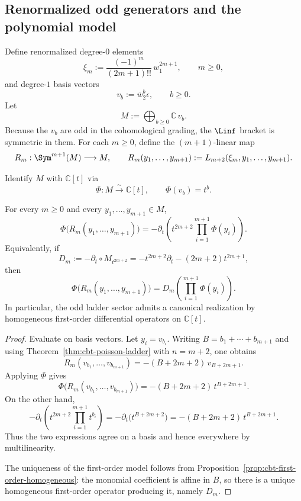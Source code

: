 \subsection{Renormalized odd generators and the polynomial model}
\label{sec:cbt-renormalized-odd}

Define renormalized degree-$0$ elements
\[
\xi_m:=\frac{(-1)^m}{(2m+1)!!}\,w_1^{2m+1},
\qquad m\ge0,
\]
and degree-$1$ basis vectors
\[
v_b:=\bar w_2^b\epsilon,
\qquad b\ge0.
\]
Let
\[
M:=\bigoplus_{b\ge0}\mathbb{C}\,v_b.
\]
Because the $v_b$ are odd in the cohomological grading, the $\Linf$ bracket is symmetric in them. For each $m\ge0$, define the $(m+1)$-linear map
\[
R_m:\Sym^{m+1}(M)\longrightarrow M,
\qquad
R_m(y_1,\dots,y_{m+1}):=
L_{m+2}(\xi_m,y_1,\dots,y_{m+1}).
\]

Identify $M$ with $\mathbb{C}[t]$ via
\[
\Phi:M\xrightarrow{\;\sim\;}\mathbb{C}[t],
\qquad
\Phi(v_b)=t^b.
\]

\begin{theorem}
\label{thm:cbt-airy-witt}
\ClaimStatusProvedHere
For every $m\ge0$ and every $y_1,\dots,y_{m+1}\in M$,
\[
\Phi\bigl(R_m(y_1,\dots,y_{m+1})\bigr)
=
-\partial_t\!\left(
t^{2m+2}\prod_{i=1}^{m+1}\Phi(y_i)
\right).
\]
Equivalently, if
\[
D_m:=-\partial_t\circ M_{t^{2m+2}}
=
-t^{2m+2}\partial_t-(2m+2)t^{2m+1},
\]
then
\[
\Phi\bigl(R_m(y_1,\dots,y_{m+1})\bigr)
=
D_m\!\left(\prod_{i=1}^{m+1}\Phi(y_i)\right).
\]
In particular, the odd ladder sector admits a canonical realization by homogeneous first-order differential operators on $\mathbb{C}[t]$.
\end{theorem}

\begin{proof}
Evaluate on basis vectors. Let $y_i=v_{b_i}$. Writing $B=b_1+\cdots+b_{m+1}$ and using Theorem~\ref{thm:cbt-poisson-ladder} with $n=m+2$, one obtains
\[
R_m(v_{b_1},\dots,v_{b_{m+1}})
=
-(B+2m+2)\,v_{B+2m+1}.
\]
Applying $\Phi$ gives
\[
\Phi\bigl(R_m(v_{b_1},\dots,v_{b_{m+1}})\bigr)
=
-(B+2m+2)\,t^{B+2m+1}.
\]
On the other hand,
\[
-\partial_t\!\left(
t^{2m+2}\prod_{i=1}^{m+1}t^{b_i}
\right)
=
-\partial_t\bigl(t^{B+2m+2}\bigr)
=
-(B+2m+2)\,t^{B+2m+1}.
\]
Thus the two expressions agree on a basis and hence everywhere by multilinearity.

The uniqueness of the first-order model follows from Proposition~\ref{prop:cbt-first-order-homogeneous}: the monomial coefficient is affine in $B$, so there is a unique homogeneous first-order operator producing it, namely $D_m$.
\end{proof}

